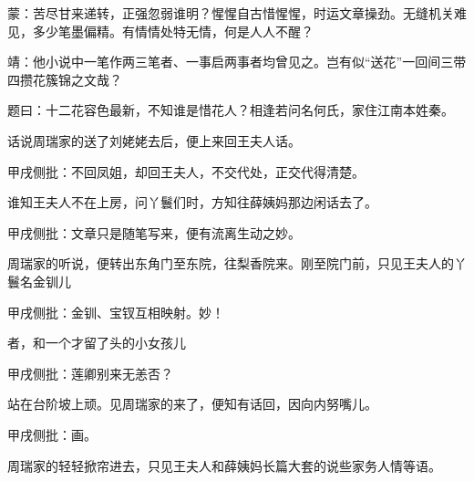 \begin{parag}

    \begin{note}蒙：苦尽甘来递转，正强忽弱谁明？惺惺自古惜惺惺，时运文章操劲。无缝机关难见，多少笔墨偏精。有情情处特无情，何是人人不醒？\end{note}
\end{parag}


\begin{parag}


    \begin{note}靖：他小说中一笔作两三笔者、一事启两事者均曾见之。岂有似“送花”一回间三带四攒花簇锦之文哉？\end{note}
\end{parag}


\begin{parag}


    题曰：十二花容色最新，不知谁是惜花人？相逢若问名何氏，家住江南本姓秦。
\end{parag}


\begin{parag}


    话说周瑞家的送了刘姥姥去后，便上来回王夫人话。\begin{note}甲戌侧批：不回凤姐，却回王夫人，不交代处，正交代得清楚。\end{note}谁知王夫人不在上房，问丫鬟们时，方知往薛姨妈那边闲话去了。\begin{note}甲戌侧批：文章只是随笔写来，便有流离生动之妙。\end{note}周瑞家的听说，便转出东角门至东院，往梨香院来。刚至院门前，只见王夫人的丫鬟名金钏儿\begin{note}甲戌侧批：金钏、宝钗互相映射。妙！\end{note}者，和一个才留了头的小女孩儿\begin{note}甲戌侧批：莲卿别来无恙否？\end{note}站在台阶坡上顽。见周瑞家的来了，便知有话回，因向内努嘴儿。\begin{note}甲戌侧批：画。\end{note}周瑞家的轻轻掀帘进去，只见王夫人和薛姨妈长篇大套的说些家务人情等语。
\end{parag}


